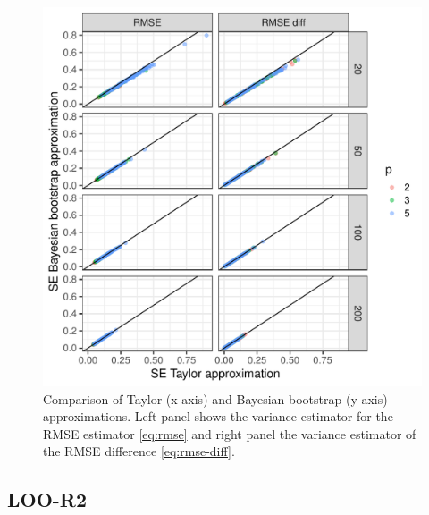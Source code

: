 \documentclass{article}
\begin{document}
\begin{figure}[!htb]
    \centering
    \includegraphics[width=\textwidth]{figures/loo_rmse.pdf}
    \caption{Comparison of Taylor (x-axis) and Bayesian bootstrap (y-axis) approximations. Left panel shows the variance estimator for the RMSE estimator \eqref{eq:rmse} and right panel the variance estimator of the RMSE difference \eqref{eq:rmse-diff}.}
    \label{fig:rmse-plot}
\end{figure}


\subsection{LOO-R2}

\newpage


\end{document}
